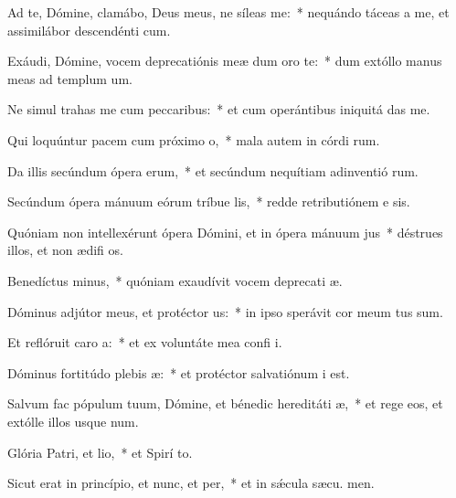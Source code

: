 \item Ad te, Dómine, clamábo, Deus meus, ne síleas  me:~* nequándo táceas a me, et assimilábor descendénti  cum.
\item Exáudi, Dómine, vocem deprecatiónis meæ dum oro  te:~* dum extóllo manus meas ad templum  um.
\item Ne simul trahas me cum peccaribus:~* et cum operántibus iniquitá  das me.
\item Qui loquúntur pacem cum próximo o,~* mala autem in córdi rum.
\item Da illis secúndum ópera erum,~* et secúndum nequítiam adinventió rum.
\item Secúndum ópera mánuum eórum tríbue lis,~* redde retributiónem e sis.
\item Quóniam non intellexérunt ópera Dómini, et in ópera mánuum jus~* déstrues illos, et non ædifi os.
\item Benedíctus minus,~* quóniam exaudívit vocem deprecati æ.
\item Dóminus adjútor meus, et protéctor us:~* in ipso sperávit cor meum  tus sum.
\item Et reflóruit caro a:~* et ex voluntáte mea confi i.
\item Dóminus fortitúdo plebis æ:~* et protéctor salvatiónum  i est.
\item Salvum fac pópulum tuum, Dómine, et bénedic hereditáti æ,~* et rege eos, et extólle illos usque  num.
\item Glória Patri, et lio,~* et Spirí to.
\item Sicut erat in princípio, et nunc, et per,~* et in sǽcula sæcu. men.
